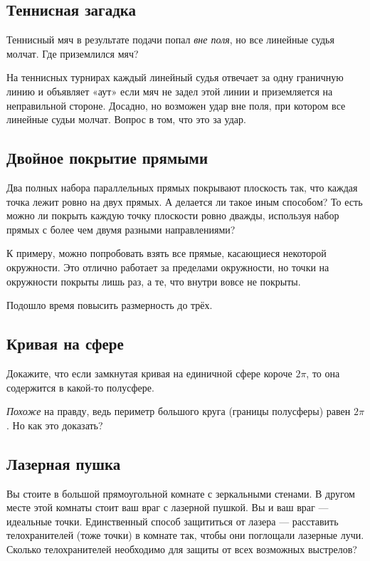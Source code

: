 \subsection*{Теннисная загадка}

Теннисный мяч в результате подачи попал \emph{вне поля}, но все линейные судья молчат.
Где приземлился мяч?

На теннисных турнирах каждый линейный судья отвечает за одну граничную линию и объявляет «аут» если мяч не задел этой линии и приземляется на неправильной стороне.
Досадно, но возможен удар вне поля, при котором все линейные судьи молчат.
Вопрос в том, что это за удар.

\subsection*{Двойное покрытие прямыми}

Два полных набора параллельных прямых покрывают плоскость так, что каждая точка лежит ровно на двух прямых.
А делается ли такое иным способом?
То есть можно ли покрыть каждую точку плоскости ровно дважды, используя набор прямых с более чем двумя разными направлениями?

 К примеру, можно попробовать взять все прямые, касающиеся некоторой окружности.
Это отлично работает за пределами окружности, но точки на окружности покрыты лишь раз, а те, что внутри вовсе не покрыты.

\medskip

Подошло время повысить размерность до трёх.

\subsection*{Кривая на сфере}

Докажите, что если замкнутая кривая на единичной сфере короче $2\pi$, то она содержится в какой-то полусфере.

 \emph{Похоже} на правду, ведь периметр большого круга (границы полусферы) равен $2\pi$.
Но как это доказать?

\subsection*{Лазерная пушка}

Вы стоите в большой прямоугольной комнате с зеркальными стенами.
В другом месте этой комнаты стоит ваш враг с лазерной пушкой.
Вы и ваш враг --- идеальные точки.
Единственный способ защититься от лазера --- расставить телохранителей (тоже точки) в комнате так, чтобы они поглощали лазерные лучи.
Сколько телохранителей необходимо для защиты от всех возможных выстрелов?


